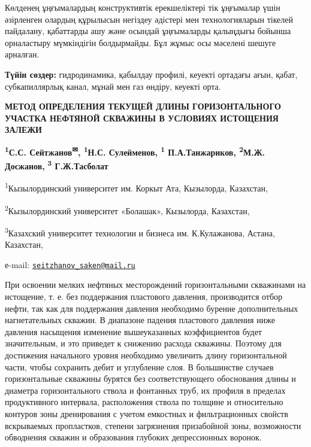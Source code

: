 Көлденең ұңғымалардың конструктивтік ерекшеліктері тік ұңғымалар үшін
әзірленген олардың құрылысын негіздеу әдістері мен технологияларын
тікелей пайдалану, қабаттарды ашу және осындай ұңғымаларды қалыңдығы
бойынша орналастыру мүмкіндігін болдырмайды. Бұл жұмыс осы мәселені
шешуге арналған.

{\bfseries Түйін сөздер:} гидродинамика, қабылдау профилі, кеуекті ортадағы
ағын, қабат, субкапиллярлық канал, мұнай мен газ өндіру, кеуекті орта.

\begin{articleheader}
{\bfseries МЕТОД ОПРЕДЕЛЕНИЯ ТЕКУЩЕЙ ДЛИНЫ ГОРИЗОНТАЛЬНОГО УЧАСТКА НЕФТЯНОЙ
СКВАЖИНЫ В УСЛОВИЯХ ИСТОЩЕНИЯ ЗАЛЕЖИ}

{\bfseries \textsuperscript{1}С.С. Сейтжанов\textsuperscript{✉},
\textsuperscript{1}Н.С. Сулейменов, \textsuperscript{1} П.А.Танжариков,
\textsuperscript{2}М.Ж. Досжанов,}
{\bfseries \textsuperscript{3} Г.Ж.Тасболат}
\end{articleheader}
\begin{affiliation}

\textsuperscript{1}Кызылординский университет им. Коркыт Ата, Кызылорда,
Казахстан,

\textsuperscript{2}Кызылординский университет «Болашак», Кызылорда,
Казахстан,

\textsuperscript{3}Казахский университет технологии и бизнеса им.
К.Кулажанова, Астана, Казахстан,

е-mail:
\href{mailto:seitzhanov_saken@mail.ru}{\nolinkurl{seitzhanov\_saken@mail.ru}}
\end{affiliation}

При освоении мелких нефтяных месторождений горизонтальными скважинами на
истощение, т. е. без поддержания пластового давления, производится отбор
нефти, так как для поддержания давления необходимо бурение
дополнительных нагнетательных скважин. В диапазоне падения пластового
давления ниже давления насыщения изменение вышеуказанных коэффициентов
будет значительным, и это приведет к снижению расхода скважины. Поэтому
для достижения начального уровня необходимо увеличить длину
горизонтальной части, чтобы сохранить дебит и углубление слоя. В
большинстве случаев горизонтальные скважины бурятся без соответствующего
обоснования длины и диаметра горизонтального ствола и фонтанных труб, их
профиля в пределах продуктивного интервала, расположения ствола по
толщине и относительно контуров зоны дренирования с учетом емкостных и
фильтрационных свойств вскрываемых пропластков, степени загрязнения
призабойной зоны, возможности обводнения скважин и образования глубоких
депрессионных воронок.


